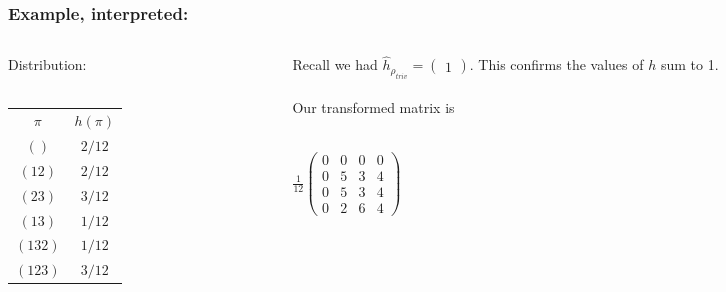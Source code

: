 \documentclass{beamer} %
\theoremstyle{definition} %
\def \pausenl {\pause $ \ $\\}
\begin{document}
\begin{frame}
	\frametitle{Example, interpreted:}
	
	\begin{columns}
		\begin{column}{.2\textwidth}
			
			Distribution:\\$ \ $\\
			
			\begin{tabular}{c<{\onslide<1->}c<{\onslide<1->}}
				$\pi$ & $h(\pi)$          \\
				$()$   & $2/12$   \\
				$(12)$   & $2/12$  \\
				$(23)$   & $3/12$  \\
				$(13)$   & $1/12$  \\
				$(132)$   & $1/12$  	\\
				$(123)$   & $3/12$    			
			\end{tabular}
		\end{column}
		
		\begin{column}{.8\textwidth}
			
			\pause
			Recall we had $\hat{h}_{\rho_{triv}} = \begin{pmatrix} 1 \end{pmatrix}$.  This confirms the values of $h$ sum to 1.\\
			\pausenl
			
			Our transformed matrix is\\$ \ $\\
			
			\begin{center}
		$	\frac{1}{12}\begin{pmatrix} 0 & 0 & 0 & 0 \\
				0 & 5 & 3 & 4 \\
				0 & 5 & 3 & 4 \\
				0 & 2 & 6 & 4 \end{pmatrix}$\\
				\end{center}

			

		
			
			


		\end{column}
		\end{columns}
		
		
		
		\end{frame}
		
\end{document}

